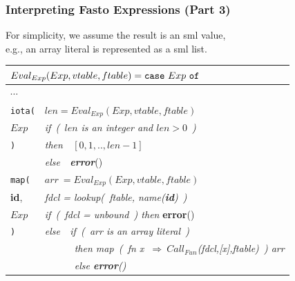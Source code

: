 \documentclass{beamer}
\newcommand{\emp}[1]{\textcolor{DikuRed}{ #1}}
\begin{document}
\begin{frame}
\frametitle{Interpreting Fasto Expressions (Part 3)}

For simplicity, we assume the result is an {\sc sml} value,\\
e.g., an array literal is represented as a {\sc sml} list.

\bigskip

\renewcommand{\arraystretch}{0.9}
\begin{tabular}{|l|l|}\hline
\multicolumn{2}{|l|}{$ Eval_{Exp}(Exp,vtable,ftable) =
  \mbox{\tt case}~Exp~\mbox{\tt of}$} \\\hline
$\cdots$ & \\\hline

{\tt iota(}
        & $len = Eval_{Exp}(Exp,vtable,ftable)$ \\
$Exp$
        & {\em if~(~$len$ is an integer and $len > 0$~)} \\
{\tt )}
        & {\em then~~$[0, 1, .., len-1]$} \\
        & {\em else~~\mbox{\bf error}}()\\\hline

{\tt map(}
        & $arr~= Eval_{Exp}(Exp,vtable,ftable)$ \\
{\bf id},
        & {\em fdcl = lookup(~ftable, name({\bf id})~)} \\
$Exp$
        & {\em if~(~fdcl = unbound~) then } {\bf error}() \\
{\tt )} 
        & {\em else~~if~(~arr is an array literal~)}\\
        & {\em ~~~~~~then \emp{map~(~fn x $~\Rightarrow~Call_{Fun}$(fdcl,[x],ftable)~) arr}}\\
        & {\em ~~~~~~else {\bf error}()} \\\hline
\end{tabular}


\end{frame}
\end{document}

